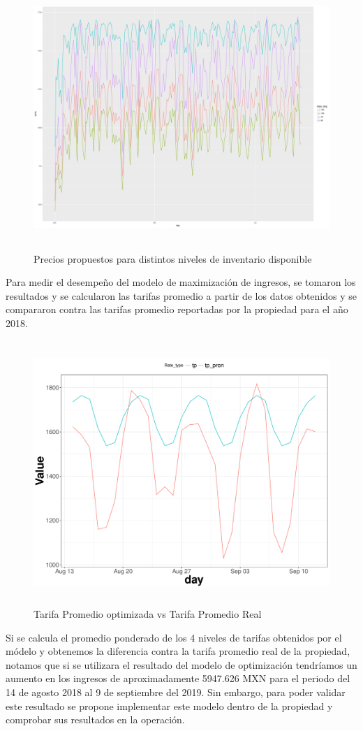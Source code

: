 \begin{figure}[H]
  \centering
      \includegraphics[width=\maxwidth,height=10cm]{figures/Pricing_graph-1}  
  \caption{Precios propuestos para distintos niveles de inventario disponible}
\end{figure}

Para medir el desempeño del modelo de maximización de ingresos, se tomaron los resultados y se calcularon las tarifas promedio a partir de los datos obtenidos y se compararon contra las tarifas promedio reportadas por la propiedad para el año 2018.

\begin{figure}[H]
  \centering
      \includegraphics[width=\maxwidth,height=10cm]{figures/Pricing-1}  
  \caption{Tarifa Promedio optimizada vs Tarifa Promedio Real}
\end{figure}


Si se calcula el promedio ponderado de los 4 niveles de tarifas obtenidos por el módelo y obtenemos la diferencia contra la tarifa promedio real de la propiedad, notamos que si se utilizara el resultado del modelo de optimización tendríamos un aumento en los ingresos de aproximadamente 5947.626 MXN para el periodo del 14 de agosto 2018 al 9 de septiembre del 2019. Sin embargo, para poder validar este resultado se propone implementar este modelo dentro de la propiedad y comprobar sus resultados en la operación.




